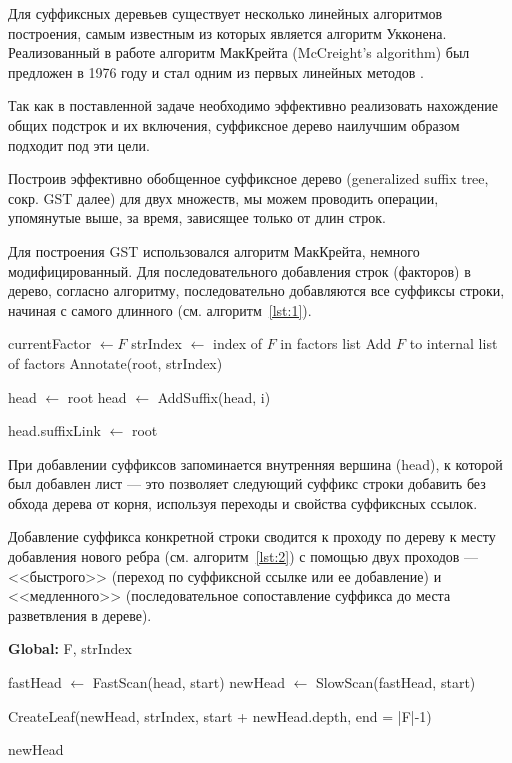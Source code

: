 \documentclass[14pt, russian]{scrartcl}
\begin{document}
Для суффиксных деревьев существует несколько линейных алгоритмов построения, самым известным из которых является алгоритм Укконена. Реализованный в работе алгоритм МакКрейта (McCreight’s algorithm) был предложен в 1976 году и стал одним из первых линейных методов \cite{gus}.

Так как в поставленной задаче необходимо эффективно реализовать нахождение общих подстрок и их включения, суффиксное дерево наилучшим образом подходит под эти цели. 

Построив эффективно обобщенное суффиксное дерево (generalized suffix tree, сокр. GST далее) для двух множеств, мы можем проводить операции, упомянутые выше, за время, зависящее только от длин строк.

Для построения GST использовался алгоритм МакКрейта, немного модифицированный. Для последовательного добавления строк (факторов) в дерево, согласно алгоритму, последовательно добавляются все суффиксы строки, начиная с самого длинного (см. алгоритм~\ref{lst:1}).

\begin{algorithm}[H]
\caption{AddFactor(F)}
\label{lst:1}
\scriptsize
\begin{algorithmic}[1]

\State currentFactor $\gets F$
\State strIndex $\gets$ index of $F$ in factors list
\State Add $F$ to internal list of factors
\State Annotate(root, strIndex)

\State head $\gets$ root
    \State head $\gets$ AddSuffix(head, i)
\EndFor

    \State head.suffixLink $\gets$ root
\EndIf

\end{algorithmic}
\end{algorithm}

При добавлении суффиксов запоминается внутренняя вершина (head), к которой был добавлен лист --- это позволяет следующий суффикс строки добавить без обхода дерева от корня, используя переходы и свойства суффиксных ссылок.

Добавление суффикса конкретной строки сводится к проходу по дереву к месту добавления нового ребра (см. алгоритм~\ref{lst:2}) с помощью двух проходов --- <<быстрого>> (переход по суффиксной ссылке или ее добавление) и <<медленного>> (последовательное сопоставление суффикса до места разветвления в дереве).

\begin{algorithm}[H]
\caption{AddSuffix(head, start)}
\label{lst:2}
\scriptsize
\begin{algorithmic}[1]
\Statex \textbf{Global:} F, strIndex

\State fastHead $\gets$ FastScan(head, start)
\State newHead $\gets$ SlowScan(fastHead, start)

\State CreateLeaf(newHead, strIndex, start + newHead.depth, end = |F|-1)

\State \Return newHead

\end{algorithmic}
\end{algorithm}
\end{document}
